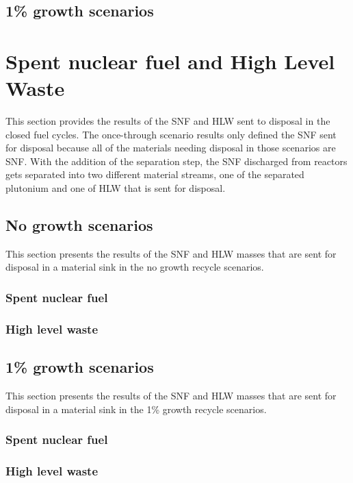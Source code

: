 \subsection{1\% growth scenarios}

\section{Spent nuclear fuel and High Level Waste}
This section provides the results of the \gls{SNF} and \gls{HLW} sent 
to disposal in the closed fuel cycles. The once-through scenario 
results only defined the \gls{SNF} sent for disposal because all 
of the materials needing disposal in those scenarios are \gls{SNF}. 
With the addition of the separation step, the \gls{SNF} discharged 
from reactors gets separated into two different material streams, 
one of the separated plutonium and one of \gls{HLW} that is sent 
for disposal.

\subsection{No growth scenarios}
This section presents the results of the \gls{SNF} and 
\gls{HLW} masses that are sent for disposal in a 
material sink in the no growth recycle scenarios. 
\subsubsection{Spent nuclear fuel}

\subsubsection{High level waste}


\subsection{1\% growth scenarios}
This section presents the results of the \gls{SNF} and 
\gls{HLW} masses that are sent for disposal in a 
material sink in the 1\% growth recycle scenarios. 
\subsubsection{Spent nuclear fuel}

\subsubsection{High level waste}